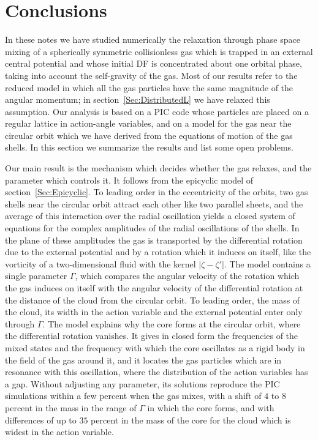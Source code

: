 \section{Conclusions}
\label{Sec:Conclusions}


In these notes we have studied numerically the relaxation through phase space mixing of a spherically symmetric collisionless gas which is trapped in an external central potential and whose initial DF is concentrated about one orbital phase, taking into account the self-gravity of the gas. Most of our results refer to the reduced model in which all the gas particles have the same magnitude of the angular momentum; in section~\ref{Sec:DistributedL} we have relaxed this assumption. Our analysis is based on a PIC code whose particles are placed on a regular lattice in action-angle variables, and on a model for the gas near the circular orbit which we have derived from the equations of motion of the gas shells. In this section we summarize the results and list some open problems.

Our main result is the mechanism which decides whether the gas relaxes, and the parameter which controls it. It follows from the epicyclic model of section~\ref{Sec:Epicyclic}. To leading order in the eccentricity of the orbits, two gas shells near the circular orbit attract each other like two parallel sheets, and the average of this interaction over the radial oscillation yields a closed system of equations for the complex amplitudes of the radial oscillations of the shells. In the plane of these amplitudes the gas is transported by the differential rotation due to the external potential and by a rotation which it induces on itself, like the vorticity of a two-dimensional fluid with the kernel $|\zeta - \zeta'|$. The model contains a single parameter $\Gamma$, which compares the angular velocity of the rotation which the gas induces on itself with the angular velocity of the differential rotation at the distance of the cloud from the circular orbit. To leading order, the mass of the cloud, its width in the action variable and the external potential enter only through $\Gamma$. The model explains why the core forms at the circular orbit, where the differential rotation vanishes. It gives in closed form the frequencies of the mixed states and the frequency with which the core oscillates as a rigid body in the field of the gas around it, and it locates the gas particles which are in resonance with this oscillation, where the distribution of the action variables has a gap. Without adjusting any parameter, its solutions reproduce the PIC simulations within a few percent when the gas mixes, with a shift of $4$ to $8$ percent in the mass in the range of $\Gamma$ in which the core forms, and with differences of up to $35$ percent in the mass of the core for the cloud which is widest in the action variable.

